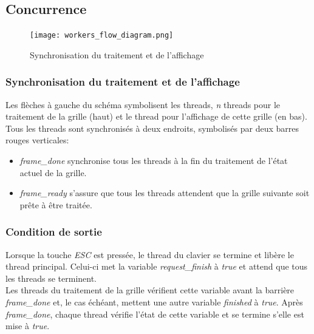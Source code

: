 \documentclass[11pt, a4paper]{article}
\begin{document}
\newpage

\subsection{Concurrence}
\label{concurrence}

\begin{figure}[H]
	\begin{center}
		\texttt{[image: workers\_flow\_diagram.png]}
	\end{center}
	\caption{Synchronisation du traitement et de l'affichage}
	\label{Synchronisation du traitement et de l'affichage}
\end{figure}

\subsubsection{Synchronisation du traitement et de l'affichage}

Les flèches à gauche du schéma symbolisent les threads, \textit{n} threads pour le traitement de la grille (haut) et le thread pour l'affichage de cette grille (en bas). \\

Tous les threads sont synchronisés à deux endroits, symbolisés par deux barres rouges verticales:
\begin{itemize}
	\item \textit{frame\_done} synchronise tous les threads à la fin du traitement de l'état actuel de la grille.
	\item \textit{frame\_ready} s'assure que tous les threads attendent que la grille suivante soit prête à être traitée.
\end{itemize}

\subsubsection{Condition de sortie}

Lorsque la touche \textit{ESC} est pressée, le thread du clavier se termine et libère le thread principal. Celui-ci met la variable \textit{request\_finish} à \textit{true} et attend que tous les threads se terminent. \\

Les threads du traitement de la grille vérifient cette variable avant la barrière \textit{frame\_done} et, le cas échéant, mettent une autre variable \textit{finished} à \textit{true}. Après \textit{frame\_done}, chaque thread vérifie l'état de cette variable et se termine s'elle est mise à \textit{true}. \\
\end{document}
